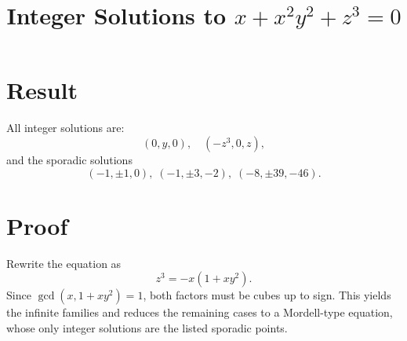 \documentclass{article}
\begin{document}
\title{Integer Solutions to $x + x^2 y^2 + z^3 = 0$}
\author{}
\date{}
\maketitle

\section*{Result}
All integer solutions are:
\[
(0,y,0),\quad (-z^3,0,z),
\]
and the sporadic solutions
\[
(-1,\pm1,0),\; (-1,\pm3,-2),\; (-8,\pm39,-46).
\]

\section*{Proof}
Rewrite the equation as
\[
z^3 = -x(1 + xy^2).
\]
Since $\gcd(x,1+xy^2)=1$, both factors must be cubes up to sign. This yields the infinite families and reduces the remaining cases to a Mordell-type equation, whose only integer solutions are the listed sporadic points.
\end{document}
